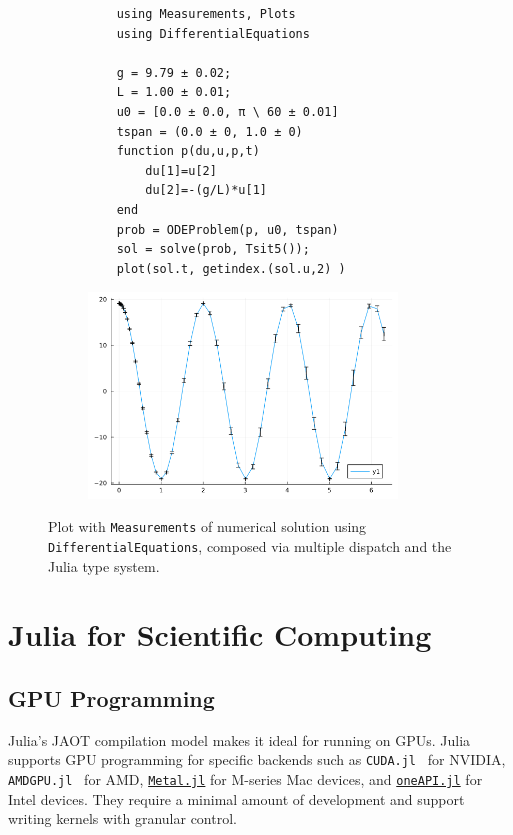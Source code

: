 \documentclass{webofc}
\begin{document}
\begin{figure}[!ht]
\begin{subfigure}[t!]{0.45\textwidth}
    \begin{verbatim}
    using Measurements, Plots
    using DifferentialEquations

    g = 9.79 ± 0.02; 
    L = 1.00 ± 0.01;
    u0 = [0.0 ± 0.0, π \ 60 ± 0.01]
    tspan = (0.0 ± 0, 1.0 ± 0) 
    function p(du,u,p,t)
        du[1]=u[2]
        du[2]=-(g/L)*u[1]
    end
    prob = ODEProblem(p, u0, tspan) 
    sol = solve(prob, Tsit5());
    plot(sol.t, getindex.(sol.u,2) ) 
    \end{verbatim}
\end{subfigure}
\hfill
\begin{subfigure}[t!]{0.5\textwidth}
    \includegraphics[width=0.9\textwidth]{errorbars.png}
\end{subfigure}
    \caption{Plot with \texttt{Measurements} of numerical solution using \texttt{DifferentialEquations}, 
    composed via multiple dispatch and the Julia type system.}
    \label{code:plotmeasure}
    \end{figure}


\section{Julia for Scientific Computing}
\label{sec:juliascicomp}

    
\subsection{GPU Programming}
\label{sec:gpuprog}

Julia's JAOT compilation model makes it ideal for running on GPUs. Julia
supports GPU programming for specific backends such as
\texttt{CUDA.jl}~\cite{besard2018juliagpu} for NVIDIA,
\texttt{AMDGPU.jl}~\cite{julian_samaroo_2025_14826765} for AMD,
\href{https://github.com/JuliaGPU/Metal.jl}{\texttt{Metal.jl}} for M-series Mac
devices, and \href{https://github.com/JuliaGPU/oneAPI.jl}{\texttt{oneAPI.jl}}
for Intel devices. They require a minimal amount of development and support
writing kernels with granular control.
\end{document}

